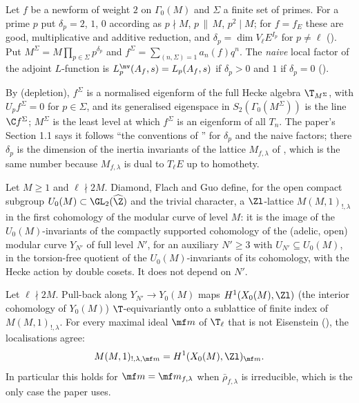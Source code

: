 \begin{definition}\label{def:congruence:depletion-recall}
Let $f$ be a newform of weight $2$ on $\Gamma_0(M)$ and $\Sigma$ a finite set of primes. For a prime $p$ put $\delta_p=2$, $1$, $0$ according as $p\nmid M$, $p\,\|\,M$, $p^2\mid M$; for $f=f_E$ these
are good, multiplicative and additive reduction, and $\delta_p=\dim V_\ell E^{I_p}$ for $p\ne\ell$ (). Put $M^\Sigma=M\prod_{p\in\Sigma}p^{\delta_p}$ and
$f^\Sigma=\sum_{(n,\Sigma)=1}a_n(f)q^n$. The \emph{naive} local factor of the adjoint $L$-function is $L^{\nv}_p(A_f,s)=L_p(A_f,s)$ if $\delta_p>0$ and $1$ if $\delta_p=0$ ().
\end{definition}

By  (depletion), $f^\Sigma$ is a normalised eigenform of the full Hecke algebra $\T_{M^\Sigma}$, with $U_pf^\Sigma=0$ for $p\in\Sigma$, and its generalised eigenspace in
$S_2(\Gamma_0(M^\Sigma))$ is the line $\C f^\Sigma$; $M^\Sigma$ is the least level at which $f^\Sigma$ is an eigenform of all $T_n$. The paper's Section 1.1 says it follows ``the conventions of
\cite[\S1.7.2]{DFG04}'' for $\delta_p$ and the naive factors; there $\delta_p$ is the dimension of the inertia invariants of the lattice $M_{f,\lambda}$ of , which is the
same number because $M_{f,\lambda}$ is dual to $T_\ell E$ up to homothety.

\begin{definition}\label{def:congruence:integral-structure}
Let $M\ge1$ and $\ell\nmid 2M$. Diamond, Flach and Guo \cite[Sections 1.2, 1.4]{DFG04} define, for the open compact subgroup $U_0(M)\subset\GL_2(\widehat\Z)$ and the trivial character, a
$\Zl$-lattice $M(M,1)_{!,\lambda}$ in the first cohomology of the modular curve of level $M$: it is the image of the $U_0(M)$-invariants of the compactly supported cohomology
of the (adelic, open) modular curve $Y_{N'}$ of full level $N'$, for an auxiliary $N'\ge3$ with $U_{N'}\subseteq U_0(M)$, in the torsion-free quotient of the $U_0(M)$-invariants of its
cohomology, with the Hecke action by double cosets. It does not depend on $N'$.
\end{definition}

\begin{proposition}\label{prop:congruence:integral-structure}
Let $\ell\nmid2M$. Pull-back along $Y_{N'}\to Y_0(M)$ maps $H^1(X_0(M),\Zl)$ (the interior cohomology of $Y_0(M)$) $\T$-equivariantly onto a sublattice of finite index of $M(M,1)_{!,\lambda}$. For
every maximal ideal $\mf m$ of $\T_\ell$ that is not Eisenstein (), the localisations agree:
\[
M(M,1)_{!,\lambda,\mf m}=H^1(X_0(M),\Zl)_{\mf m}.
\]
In particular this holds for $\mf m=\mf m_{f,\lambda}$ when $\bar\rho_{f,\lambda}$ is irreducible, which is the only case the paper uses.
\end{proposition}

